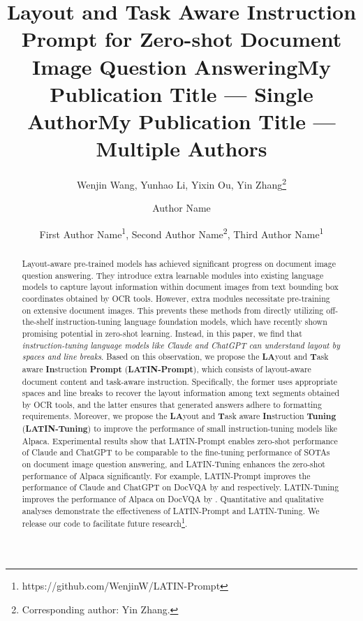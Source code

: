 \documentclass[letterpaper]{article} \usepackage{aaai24_preprint}  \usepackage{times}  \usepackage{helvet}  \usepackage{courier}  \usepackage[hyphens]{url}  \usepackage{graphicx} \urlstyle{rm} \def\UrlFont{\rm}  \usepackage{natbib}  \usepackage{caption} \frenchspacing  \setlength{\pdfpagewidth}{8.5in} \setlength{\pdfpageheight}{11in} \usepackage{algorithm}
\title{Layout and Task Aware Instruction Prompt for Zero-shot Document Image Question Answering}
\author{
Wenjin Wang, Yunhao Li, Yixin Ou, Yin Zhang\thanks{Corresponding author: Yin Zhang.}
}
\title{My Publication Title --- Single Author}
\author {
    Author Name
}
\title{My Publication Title --- Multiple Authors}
\author {
First Author Name\textsuperscript{\rm 1},
    Second Author Name\textsuperscript{\rm 2},
    Third Author Name\textsuperscript{\rm 1}
}
\begin{document}
\maketitle

\begin{abstract}
Layout-aware pre-trained models has achieved significant progress on document image question answering.
They introduce extra learnable modules into existing language models to capture layout information within document images from text bounding box coordinates obtained by OCR tools.
However, extra modules necessitate pre-training on extensive document images.
This prevents these methods from directly utilizing off-the-shelf instruction-tuning language foundation models, which have recently shown promising potential in zero-shot learning.
Instead, in this paper, we find that \emph{instruction-tuning language models like Claude and ChatGPT can understand layout by spaces and line breaks}.
Based on this observation, we propose the \textbf{LA}yout and \textbf{T}ask aware \textbf{In}struction \textbf{Prompt} (\textbf{LATIN-Prompt}), which consists of layout-aware document content and task-aware instruction.
Specifically, the former uses appropriate spaces and line breaks to recover the layout information among text segments obtained by OCR tools, and the latter ensures that generated answers adhere to formatting requirements.
Moreover, we propose the \textbf{LA}yout and \textbf{T}ask aware \textbf{In}struction \textbf{Tuning} (\textbf{LATIN-Tuning}) to improve the performance of small instruction-tuning models like Alpaca.
Experimental results show that LATIN-Prompt enables zero-shot performance of Claude and ChatGPT to be comparable to the fine-tuning performance of SOTAs on document image question answering, and LATIN-Tuning enhances the zero-shot performance of Alpaca significantly.
For example, LATIN-Prompt improves the performance of Claude and ChatGPT on DocVQA by  and  respectively.
LATIN-Tuning improves the performance of Alpaca on DocVQA by .
Quantitative and qualitative analyses demonstrate the effectiveness of LATIN-Prompt and LATIN-Tuning.
We release our code to facilitate future research\footnote{https://github.com/WenjinW/LATIN-Prompt}.
\end{abstract}
\end{document}

